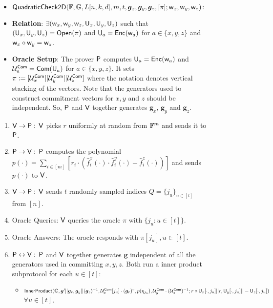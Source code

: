 \begin{figure}[h!]
\centering
\begin{framed}
	\begin{itemize}
		\item {$\mathsf{QuadraticCheck2D} (\mathbb{F}, \mathbb{G}, L[n,k,d], m, t, \bm{g}_x, \bm{g}_y, \bm{g}_z, [\pi]; \mathsf{w}_x, \mathsf{w}_y, \mathsf{w}_z)$}:
		\item {\bf Relation}: $\exists (\mathsf{w}_x, \mathsf{w}_y, \mathsf{w}_z, \mathsf{U}_x, \mathsf{U}_y, \mathsf{U}_z)$ such that $(\mathsf{U}_x, \mathsf{U}_y, \mathsf{U}_z) = \mathsf{Open}(\pi)$ and $\mathsf{U}_a = \mathsf{Enc}(\mathsf{w}_a)$ for $a\in \{x,y,z\}$ and $\mathsf{w}_x \circ \mathsf{w}_y = \mathsf{w}_z$.
		\item {\bf Oracle Setup}: The prover $\mathsf{P}$ computes $\mathsf{U}_a = \mathsf{Enc}(\mathsf{w}_a)$ and $\mathcal{U}^{\mathsf{Com}}_a = \mathsf{Com}(\mathsf{U}_a)$ for $a\in \{x,y,z\}$. It sets $\pi := [\mathcal{U}^{\mathsf{Com}}_{x} || \mathcal{U}^{\mathsf{Com}}_{y} || \mathcal{U}^{\mathsf{Com}}_{z}]$ where the notation denotes vertical stacking of the vectors. Note that the generators used to construct commitment vectors for $x, y$ and $z$ should be independent. So, $\mathsf{P}$ and $\mathsf{V}$ together generates $\bm{g}_x$, $\bm{g}_y$ and $\bm{g}_z$.
	\end{itemize}
\begin{enumerate}
	\item $\mathsf{V} \rightarrow \mathsf{P}: $ $\mathsf{V}$ picks $r$ uniformly at random from $\mathbb{F}^{m}$ and sends it to $\mathsf{P}$.
	
	\item $\mathsf{P} \rightarrow \mathsf{V}: $ $\mathsf{P}$ computes the polynomial $p(\cdot)= \sum_{i\in [m]} [r_i\cdot (\hat{f}^x_i(\cdot)\cdot \hat{f}^y_i(\cdot) - \hat{f}^z_i(\cdot))] $ and sends $p(\cdot)$ to $\mathsf{V}$. 
	
	\item $\mathsf{V} \rightarrow \mathsf{P}: $ $\mathsf{V}$ sends $t$ randomly sampled indices $Q=\{j_u\}_{u\in[t]}$ from $[n]$.
	
	\item Oracle Queries: $\mathsf{V}$ queries the oracle $\pi$ with $\{j_u : u\in [t]\}$.
	\item Oracle Answers: The oracle responds with $\pi[j_u], u\in[t]$.
	\item $\mathsf{P} \leftrightarrow \mathsf{V}: $ $\mathsf{P}$ and $\mathsf{V}$ together generates $\bm{g}$ independent of all the generators used in committing $x,y,z$. Both run a inner product subprotocol for each $u\in[t]$:
	\begin{itemize}
		\item $\mathsf{InnerProduct}(\mathbb{G},\bm{g}'||\bm{g}_r, \bm{g}_y||(\bm{g}_z)^{-1}, \mathcal{U}^{\mathsf{Com}}_x[j_u]\cdot (\bm{g}_r)^r, p(\eta_{j_u}), \mathcal{U}^{\mathsf{Com}}_y\cdot (\mathcal{U}^{\mathsf{Com}}_z)^{-1}; r\circ\mathsf{U}_x[\cdot,j_u]||r, \mathsf{U}_y[\cdot,j_u]||-\mathsf{U}_z[\cdot,j_u])$ $\forall u\in [t]$,
		

\end{itemize}
\end{enumerate}
\end{framed}
\end{figure}
